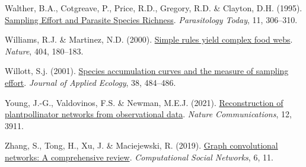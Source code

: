 \documentclass[11pt]{article}
\newlength{\cslhangindent}
\newenvironment{CSLReferences}[3] %
 {%
  \setlength{\parindent}{0pt}
  \ifodd #1 \everypar{\setlength{\hangindent}{\cslhangindent}}\ignorespaces\fi
  \ifnum #2 > 0
  \setlength{\parskip}{#2\baselineskip}
  \fi
 }%
 {}
\begin{document}
\begin{CSLReferences}{1}{0}
\leavevmode{}%
Walther, B.A., Cotgreave, P., Price, R.D., Gregory, R.D. \& Clayton,
D.H. (1995).
\href{https://doi.org/10.1016/0169-4758(95)80047-6}{Sampling Effort and
Parasite Species Richness}. \emph{Parasitology Today}, 11, 306--310.

\leavevmode{}%
Williams, R.J. \& Martinez, N.D. (2000).
\href{https://doi.org/10.1038/35004572}{Simple rules yield complex food
webs}. \emph{Nature}, 404, 180--183.

\leavevmode{}%
Willott, S.j. (2001).
\href{https://doi.org/10.1046/j.1365-2664.2001.00589.x}{Species
accumulation curves and the measure of sampling effort}. \emph{Journal
of Applied Ecology}, 38, 484--486.

\leavevmode{}%
Young, J.-G., Valdovinos, F.S. \& Newman, M.E.J. (2021).
\href{https://doi.org/10.1038/s41467-021-24149-x}{Reconstruction of
plantpollinator networks from observational data}. \emph{Nature
Communications}, 12, 3911.

\leavevmode{}%
Zhang, S., Tong, H., Xu, J. \& Maciejewski, R. (2019).
\href{https://doi.org/10.1186/s40649-019-0069-y}{Graph convolutional
networks: A comprehensive review}. \emph{Computational Social Networks},
6, 11.

\end{CSLReferences}
\end{document}
